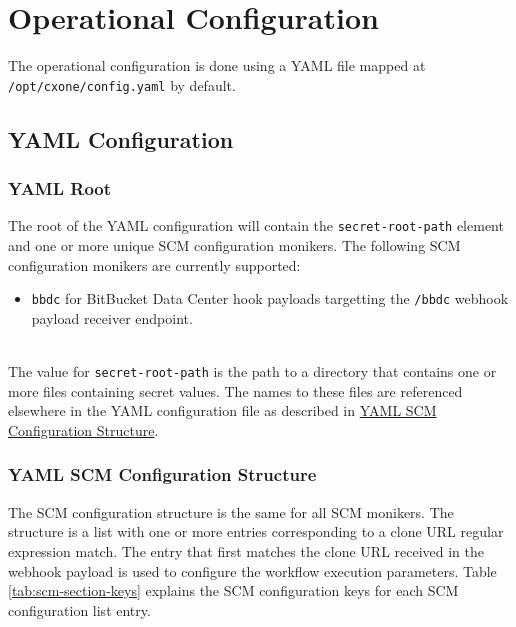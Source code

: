 \section{Operational Configuration}

The operational configuration is done using a YAML file mapped at \texttt{/opt/cxone/config.yaml}
by default.  

\subsection{YAML Configuration}

\subsubsection{YAML Root}\label{sec:yaml-root}

The root of the YAML configuration will contain the \texttt{secret-root-path} element
and one or more unique SCM configuration monikers.  The following SCM configuration monikers
are currently supported:

\begin{itemize}
    \item \texttt{bbdc} for BitBucket Data Center hook payloads targetting the \texttt{/bbdc}
    webhook payload receiver endpoint.
\end{itemize}


\noindent\\The value for \texttt{secret-root-path} is the path to a directory that contains one
or more files containing secret values.  The names to these files are referenced elsewhere
in the YAML configuration file as described in
\hyperref[sec:scm-block-structure]{YAML SCM Configuration Structure}.


\subsubsection{YAML SCM Configuration Structure}\label{sec:scm-block-structure}

The SCM configuration structure is the same for all SCM monikers. The structure is a list with
one or more entries corresponding to a clone URL regular expression match.  The entry
that first matches the clone URL received in the webhook payload is used to configure
the workflow execution parameters.  Table \ref{tab:scm-section-keys} explains the SCM
configuration keys for each SCM configuration list entry.

